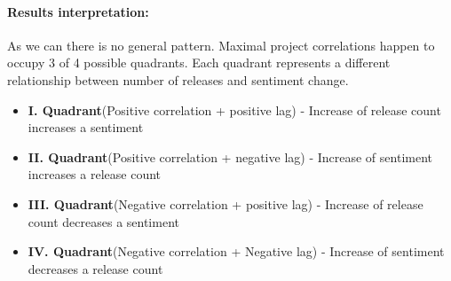 \paragraph{Results interpretation:}

As we can there is no general pattern. Maximal project correlations happen to occupy 3 of 4 possible quadrants. Each quadrant represents a different relationship between number of releases and sentiment change.

\begin{itemize}
  \item \textbf{I. Quadrant}(Positive correlation + positive lag) - Increase of release count increases a sentiment
  \item \textbf{II. Quadrant}(Positive correlation + negative lag) - Increase of sentiment increases a release count
  \item \textbf{III. Quadrant}(Negative correlation + positive lag) - Increase of release count decreases a sentiment
  \item \textbf{IV. Quadrant}(Negative correlation + Negative lag) - Increase of sentiment decreases a release count
\end{itemize}
